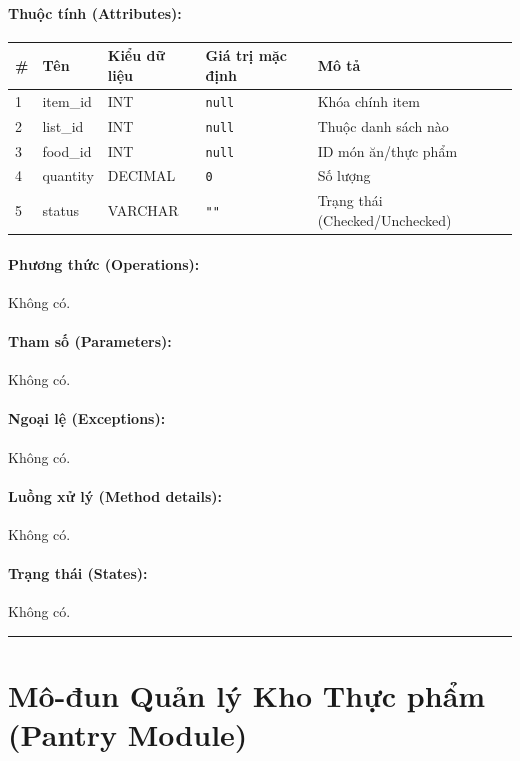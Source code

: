 \documentclass[12pt,a4paper]{article}
\begin{document}
\paragraph{Thuộc tính (Attributes):}
\begin{longtable}{|p{0.6cm}|p{2.8cm}|p{2.2cm}|p{1.8cm}|p{5.8cm}|}
\hline
\textbf{\#} & \textbf{Tên} & \textbf{Kiểu dữ liệu} & \textbf{Giá trị mặc định} & \textbf{Mô tả} \\ \hline
\endhead
1 & item\_id & INT & \texttt{null} & Khóa chính item \\ \hline
2 & list\_id & INT & \texttt{null} & Thuộc danh sách nào \\ \hline
3 & food\_id & INT & \texttt{null} & ID món ăn/thực phẩm \\ \hline
4 & quantity & DECIMAL & \texttt{0} & Số lượng \\ \hline
5 & status & VARCHAR & \texttt{""} & Trạng thái (Checked/Unchecked) \\ \hline
\end{longtable}

\paragraph{Phương thức (Operations):}
Không có.

\paragraph{Tham số (Parameters):}
Không có.

\paragraph{Ngoại lệ (Exceptions):}
Không có.

\paragraph{Luồng xử lý (Method details):}
Không có.

\paragraph{Trạng thái (States):}
Không có.

\vskip 0.5cm
\noindent\rule{\textwidth}{0.5pt}
\vskip 0.5cm

\section{Mô-đun Quản lý Kho Thực phẩm (Pantry Module)}
\end{document}
